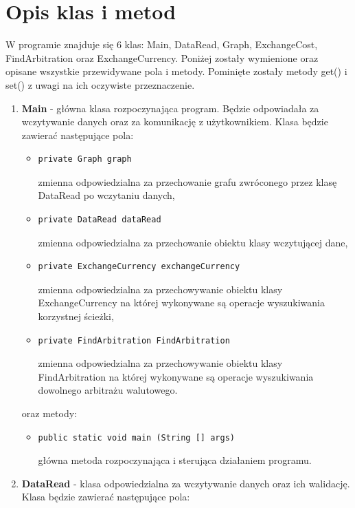 ﻿\documentclass[12pt]{article}
\begin{document}
\section{Opis klas i metod}
W programie znajduje się 6 klas: Main, DataRead, Graph, ExchangeCost, FindArbitration oraz ExchangeCurrency. Poniżej zostały wymienione oraz opisane wszystkie przewidywane pola i metody. Pominięte zostały metody get() i set() z uwagi na ich oczywiste przeznaczenie.
\begin{enumerate}
\item \textbf{Main} - główna klasa rozpoczynająca program. Będzie odpowiadała za wczytywanie danych oraz za komunikację z użytkownikiem. Klasa będzie zawierać następujące pola:
    \begin{itemize}
        \item \begin{verbatim}private Graph graph\end{verbatim}
        zmienna odpowiedzialna za przechowanie grafu zwróconego przez klasę DataRead po wczytaniu danych,
    \item \begin{verbatim}private DataRead dataRead\end{verbatim}
        zmienna odpowiedzialna za przechowanie obiektu klasy wczytującej dane,
    \item \begin{verbatim}private ExchangeCurrency exchangeCurrency\end{verbatim}
        zmienna odpowiedzialna za przechowywanie obiektu klasy ExchangeCurrency na której wykonywane są operacje wyszukiwania korzystnej ścieżki,
    \item \begin{verbatim}private FindArbitration FindArbitration\end{verbatim}
        zmienna odpowiedzialna za przechowywanie obiektu klasy FindArbitration na której wykonywane są operacje wyszukiwania dowolnego arbitrażu walutowego.
    \end{itemize}
    oraz metody:
    \begin{itemize}
        \item \begin{verbatim}public static void main (String [] args)\end{verbatim}
        główna metoda rozpoczynająca i sterująca działaniem programu.
    \end{itemize}
\item \textbf{DataRead} - klasa odpowiedzialna za wczytywanie danych oraz ich walidację. Klasa będzie zawierać następujące pola:

\end{enumerate}
\end{document}
